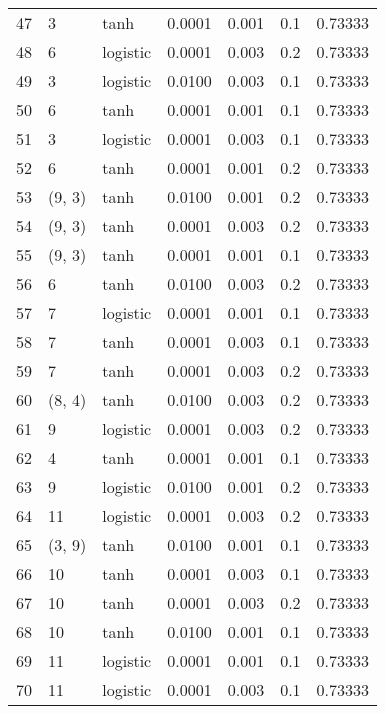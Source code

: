 \begin{tabular}{lllrrrr}
47  &           3 &      tanh &  0.0001 &  0.001 &  0.1 &   0.73333 \\
48  &           6 &  logistic &  0.0001 &  0.003 &  0.2 &   0.73333 \\
49  &           3 &  logistic &  0.0100 &  0.003 &  0.1 &   0.73333 \\
50  &           6 &      tanh &  0.0001 &  0.001 &  0.1 &   0.73333 \\
51  &           3 &  logistic &  0.0001 &  0.003 &  0.1 &   0.73333 \\
52  &           6 &      tanh &  0.0001 &  0.001 &  0.2 &   0.73333 \\
53  &      (9, 3) &      tanh &  0.0100 &  0.001 &  0.2 &   0.73333 \\
54  &      (9, 3) &      tanh &  0.0001 &  0.003 &  0.2 &   0.73333 \\
55  &      (9, 3) &      tanh &  0.0001 &  0.001 &  0.1 &   0.73333 \\
56  &           6 &      tanh &  0.0100 &  0.003 &  0.2 &   0.73333 \\
57  &           7 &  logistic &  0.0001 &  0.001 &  0.1 &   0.73333 \\
58  &           7 &      tanh &  0.0001 &  0.003 &  0.1 &   0.73333 \\
59  &           7 &      tanh &  0.0001 &  0.003 &  0.2 &   0.73333 \\
60  &      (8, 4) &      tanh &  0.0100 &  0.003 &  0.2 &   0.73333 \\
61  &           9 &  logistic &  0.0001 &  0.003 &  0.2 &   0.73333 \\
62  &           4 &      tanh &  0.0001 &  0.001 &  0.1 &   0.73333 \\
63  &           9 &  logistic &  0.0100 &  0.001 &  0.2 &   0.73333 \\
64  &          11 &  logistic &  0.0001 &  0.003 &  0.2 &   0.73333 \\
65  &      (3, 9) &      tanh &  0.0100 &  0.001 &  0.1 &   0.73333 \\
66  &          10 &      tanh &  0.0001 &  0.003 &  0.1 &   0.73333 \\
67  &          10 &      tanh &  0.0001 &  0.003 &  0.2 &   0.73333 \\
68  &          10 &      tanh &  0.0100 &  0.001 &  0.1 &   0.73333 \\
69  &          11 &  logistic &  0.0001 &  0.001 &  0.1 &   0.73333 \\
70  &          11 &  logistic &  0.0001 &  0.003 &  0.1 &   0.73333 \\

\end{tabular}
